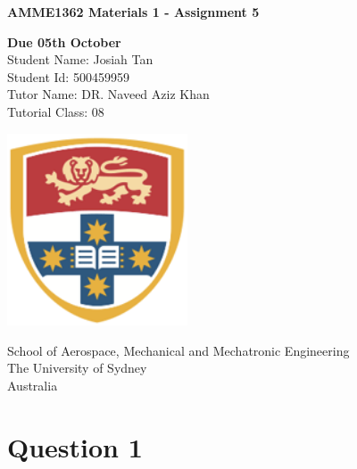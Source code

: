 \documentclass[11]{article}
\begin{document}
\begin{titlepage}
	\begin{center}
		\vspace*{1cm}

		\Huge
		\textbf{AMME1362 Materials 1 - Assignment 5}

		\vspace{0.5cm}
		\LARGE
		\textbf{Due 05th October} \\
		Student Name: Josiah Tan\\
		Student Id:  500459959\\
		Tutor Name: DR. Naveed Aziz Khan\\
		Tutorial Class: 08

		\vspace{1.5cm}

		\large
		\vspace{1cm}

		\vfill

		\vspace{0.4cm}

		\includegraphics[width=0.4\textwidth]{photos/university-of-sydney.png}

		\Large
		School of Aerospace, Mechanical and Mechatronic Engineering\\
		The University of Sydney\\
		Australia\\

		\newpage
		\tableofcontents %
	\end{center}
\end{titlepage}

\newpage
\large
{}
\section{Question 1}

\end{document}
